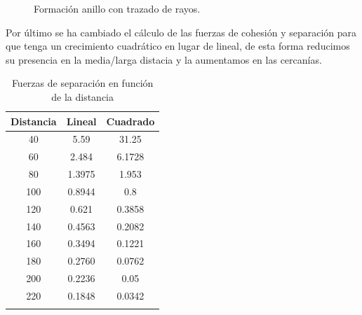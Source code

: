 \begin{figure}[ht]
\begin{minipage}[c]{0.42\linewidth}
	\label{anillo3}
\end{minipage}
\caption{Formación anillo con trazado de rayos.}
\end{figure}

Por último se ha cambiado el cálculo de las fuerzas de cohesión y separación para que tenga un crecimiento
cuadrático en lugar de lineal, de esta forma reducimos su presencia en la media/larga distacia y la aumentamos
en las cercanías.   

\begin{longtable}[c]{|c|c|c|}
\hline
Distancia & Lineal  & Cuadrado \\
\hline
\endhead
40  & \multicolumn{1}{S|}{5.59}   & \multicolumn{1}{S|}{31.25}  \\
\cmidrule[0.15pt]{0-2}
60  & \multicolumn{1}{S|}{2.484}  & \multicolumn{1}{S|}{6.1728} \\ 
\cmidrule[0.15pt]{0-2}
80  & \multicolumn{1}{S|}{1.3975} & \multicolumn{1}{S|}{1.953}  \\ 
\cmidrule[0.15pt]{0-2}
100 & \multicolumn{1}{S|}{0.8944} & \multicolumn{1}{S|}{0.8}    \\
\cmidrule[0.15pt]{0-2}
120 & \multicolumn{1}{S|}{0.621}  & \multicolumn{1}{S|}{0.3858} \\
\cmidrule[0.15pt]{0-2}
140 & \multicolumn{1}{S|}{0.4563} & \multicolumn{1}{S|}{0.2082} \\
\cmidrule[0.15pt]{0-2}
160 & \multicolumn{1}{S|}{0.3494} & \multicolumn{1}{S|}{0.1221} \\
\cmidrule[0.15pt]{0-2}
180 & \multicolumn{1}{S|}{0.2760} & \multicolumn{1}{S|}{0.0762} \\
\cmidrule[0.15pt]{0-2}
200 & \multicolumn{1}{S|}{0.2236} & \multicolumn{1}{S|}{0.05}   \\
\cmidrule[0.15pt]{0-2}
220 & \multicolumn{1}{S|}{0.1848} & \multicolumn{1}{S|}{0.0342} \\
\hline
\caption{Fuerzas de separación en función de la distancia}
\end{longtable}

\newpage

